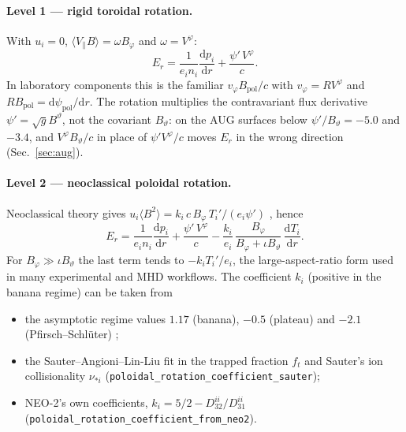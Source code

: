 \documentclass[11pt]{article}
\newcommand{\rd}{\mathrm{d}}
\newcommand{\tht}{\vartheta}
\newcommand{\ph}{\varphi}
\newcommand{\code}[1]{\texttt{#1}}
\begin{document}
\paragraph{Level 1 --- rigid toroidal rotation.}  With $u_i = 0$,
$\langle V_\parallel B\rangle = \omega B_\ph$ and $\omega = V^\ph$:
\begin{equation}\label{eq:level1}
  E_r = \frac{1}{e_i n_i}\frac{\rd p_i}{\rd r} + \frac{\psi'\,V^\ph}{c}.
\end{equation}
In laboratory components this is the familiar $v_\ph B_\mathrm{pol}/c$ with
$v_\ph = R V^\ph$ and $R B_\mathrm{pol} = \rd\psi_\mathrm{pol}/\rd r$.  The
rotation multiplies the contravariant flux derivative $\psi' = \sqrt{g}B^\tht$,
not the covariant $B_\tht$: on the AUG surfaces below $\psi'/B_\tht = -5.0$
and $-3.4$, and $V^\ph B_\tht/c$ in place of $\psi' V^\ph/c$ moves $E_r$ in
the wrong direction (Sec.~\ref{sec:aug}).

\paragraph{Level 2 --- neoclassical poloidal rotation.}  Neoclassical theory
gives $u_i\langle B^2\rangle = k_i\,c\,B_\ph\,T_i'/(e_i\psi')$
\cite{HirshmanSigmar1981,KimDiamondGroebner1991}, hence
\begin{equation}\label{eq:level2}
  E_r = \frac{1}{e_i n_i}\frac{\rd p_i}{\rd r} + \frac{\psi'\,V^\ph}{c}
      - \frac{k_i}{e_i}\,\frac{B_\ph}{B_\ph + \iota B_\tht}\,
        \frac{\rd T_i}{\rd r}.
\end{equation}
For $B_\ph \gg \iota B_\tht$ the last term tends to $-k_i T_i'/e_i$, the
large-aspect-ratio form used in many experimental and MHD workflows.  The
coefficient $k_i$ (positive in the banana regime) can be taken from
\begin{itemize}
  \item the asymptotic regime values $1.17$ (banana), $-0.5$ (plateau) and
    $-2.1$ (Pfirsch--Schl\"uter) \cite{HintonHazeltine1976,KimDiamondGroebner1991};
  \item the Sauter--Angioni--Lin-Liu fit in the trapped fraction $f_t$ and
    Sauter's ion collisionality $\nu_{*i}$ \cite{Sauter1999}
    (\code{poloidal\_rotation\_coefficient\_sauter});
  \item NEO-2's own coefficients, $k_i = 5/2 - D_{32}^{ii}/D_{31}^{ii}$
    \cite{Kasilov2014} (\code{poloidal\_rotation\_coefficient\_from\_neo2}).
\end{itemize}
\end{document}
